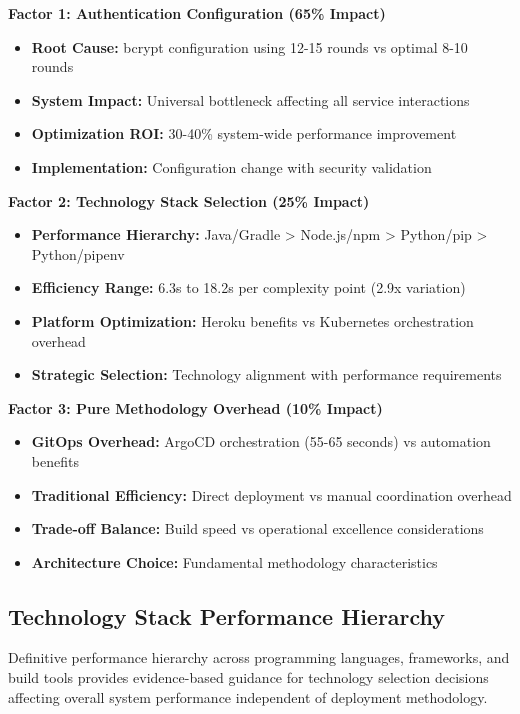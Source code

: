\textbf{Factor 1: Authentication Configuration (65\% Impact)}
\begin{itemize}
\item \textbf{Root Cause:} bcrypt configuration using 12-15 rounds vs optimal 8-10 rounds
\item \textbf{System Impact:} Universal bottleneck affecting all service interactions
\item \textbf{Optimization ROI:} 30-40\% system-wide performance improvement
\item \textbf{Implementation:} Configuration change with security validation
\end{itemize}

\textbf{Factor 2: Technology Stack Selection (25\% Impact)}
\begin{itemize}
\item \textbf{Performance Hierarchy:} Java/Gradle > Node.js/npm > Python/pip > Python/pipenv
\item \textbf{Efficiency Range:} 6.3s to 18.2s per complexity point (2.9x variation)
\item \textbf{Platform Optimization:} Heroku benefits vs Kubernetes orchestration overhead
\item \textbf{Strategic Selection:} Technology alignment with performance requirements
\end{itemize}

\textbf{Factor 3: Pure Methodology Overhead (10\% Impact)}
\begin{itemize}
\item \textbf{GitOps Overhead:} ArgoCD orchestration (55-65 seconds) vs automation benefits
\item \textbf{Traditional Efficiency:} Direct deployment vs manual coordination overhead
\item \textbf{Trade-off Balance:} Build speed vs operational excellence considerations
\item \textbf{Architecture Choice:} Fundamental methodology characteristics
\end{itemize}

\subsection{Technology Stack Performance Hierarchy}
\label{subsec:technology_hierarchy}

Definitive performance hierarchy across programming languages, frameworks, and build tools provides evidence-based guidance for technology selection decisions affecting overall system performance independent of deployment methodology.

